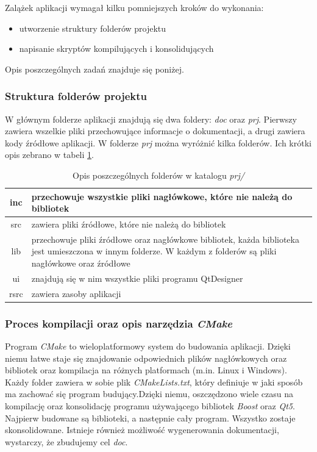\documentclass[a4paper]{article}
\begin{document}
Zalążek aplikacji wymagał kilku pomniejszych kroków do wykonania:
\begin{itemize}
	\item utworzenie struktury folderów projektu
	\item napisanie skryptów kompilujących i konsolidujących
\end{itemize}
Opis poszczególnych zadań znajduje się poniżej.

\subsubsection{Struktura folderów projektu}
W głównym folderze aplikacji znajdują się dwa foldery: \textit{doc} oraz \textit{prj}. Pierwszy zawiera wszelkie pliki przechowujące informacje o dokumentacji, a drugi zawiera kody źródłowe aplikacji. W folderze \textit{prj} można wyróżnić kilka folderów. Ich krótki opis zebrano w tabeli \ref{opis_folderow_prj}.

\begin{table}
\centering
\begin{tabularx}{0.7\linewidth}{|c|X|}
	\hline
	inc & przechowuje wszystkie pliki nagłówkowe, które nie należą do bibliotek \\ \hline
	src & zawiera pliki źródłowe, które nie należą do bibliotek \\ \hline
	lib & przechowuje pliki źródłowe oraz nagłówkowe bibliotek, każda biblioteka jest umieszczona 
		  w innym folderze. W każdym z folderów są pliki nagłówkowe oraz źródłowe \\ \hline
	ui & znajdują się w nim wszystkie pliki  programu QtDesigner \\ \hline
	rsrc  & zawiera zasoby aplikacji \\ \hline
\end{tabularx}
\caption{Opis poszczególnych folderów w katalogu \textit{prj/}}
\label{opis_folderow_prj}
\end{table}

\subsubsection{Proces kompilacji oraz opis narzędzia \textit{CMake}}
Program \textit{CMake} to wieloplatformowy system do budowania aplikacji. Dzięki niemu łatwe staje się
znajdowanie odpowiednich plików nagłówkowych oraz bibliotek oraz kompilacja na różnych platformach (m.in. Linux i Windows). Każdy folder zawiera w sobie plik \textit{CMakeLists.txt}, który definiuje w jaki sposób ma zachować się program budujący.Dzięki niemu, oszczędzono wiele czasu na kompilację oraz konsolidację programu używającego bibliotek \textit{Boost} oraz \textit{Qt5}. Najpierw budowane są biblioteki, a następnie cały program. Wszystko zostaje skonsolidowane. Istnieje również możliwość wygenerowania dokumentacji, wystarczy, że zbudujemy cel \textit{doc}.
\end{document}
